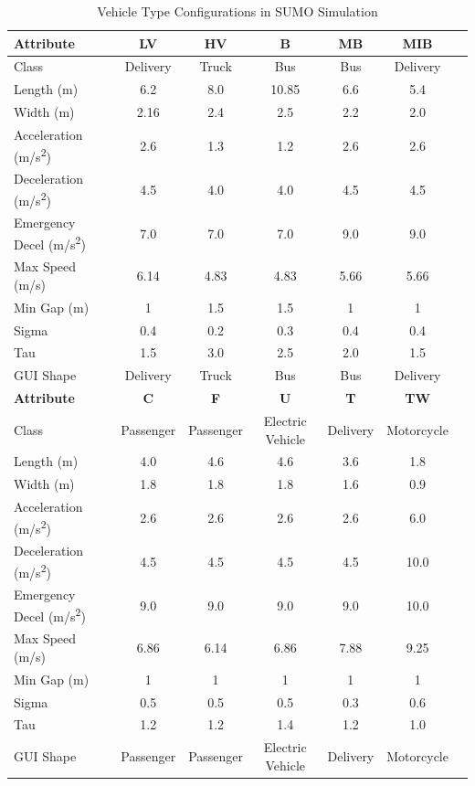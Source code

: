 \begin{table}[H]
    \centering
    \small
    \caption{Vehicle Type Configurations in SUMO Simulation}
    \label{tab:vehicle_types}
    \begin{tabular}{lcccccc}
        \toprule
        \textbf{Attribute} & \textbf{LV} & \textbf{HV} & \textbf{B} & \textbf{MB} & \textbf{MIB} \\
        \midrule
        Class & Delivery & Truck & Bus & Bus & Delivery \\
        Length (m) & 6.2 & 8.0 & 10.85 & 6.6 & 5.4 \\
        Width (m) & 2.16 & 2.4 & 2.5 & 2.2 & 2.0 \\
        Acceleration (\unit{m/s^2}) & 2.6 & 1.3 & 1.2 & 2.6 & 2.6 \\
        Deceleration (\unit{m/s^2}) & 4.5 & 4.0 & 4.0 & 4.5 & 4.5 \\
        Emergency Decel (\unit{m/s^2}) & 7.0 & 7.0 & 7.0 & 9.0 & 9.0 \\
        Max Speed (\unit{m/s}) & 6.14 & 4.83 & 4.83 & 5.66 & 5.66 \\
        Min Gap (m) & 1 & 1.5 & 1.5 & 1 & 1 \\
        Sigma & 0.4 & 0.2 & 0.3 & 0.4 & 0.4 \\
        Tau & 1.5 & 3.0 & 2.5 & 2.0 & 1.5 \\
        GUI Shape & Delivery & Truck & Bus & Bus & Delivery \\
        \midrule
        \textbf{Attribute} & \textbf{C} & \textbf{F} & \textbf{U} & \textbf{T} & \textbf{TW} \\
        \midrule
        Class & Passenger & Passenger & Electric Vehicle & Delivery & Motorcycle \\
        Length (m) & 4.0 & 4.6 & 4.6 & 3.6 & 1.8 \\
        Width (m) & 1.8 & 1.8 & 1.8 & 1.6 & 0.9 \\
        Acceleration (\unit{m/s^2}) & 2.6 & 2.6 & 2.6 & 2.6 & 6.0 \\
        Deceleration (\unit{m/s^2}) & 4.5 & 4.5 & 4.5 & 4.5 & 10.0 \\
        Emergency Decel (\unit{m/s^2}) & 9.0 & 9.0 & 9.0 & 9.0 & 10.0 \\
        Max Speed (\unit{m/s}) & 6.86 & 6.14 & 6.86 & 7.88 & 9.25 \\
        Min Gap (m) & 1 & 1 & 1 & 1 & 1 \\
        Sigma & 0.5 & 0.5 & 0.5 & 0.3 & 0.6 \\
        Tau & 1.2 & 1.2 & 1.4 & 1.2 & 1.0 \\
        GUI Shape & Passenger & Passenger & Electric Vehicle & Delivery & Motorcycle \\
        \bottomrule
    \end{tabular}
\end{table}

